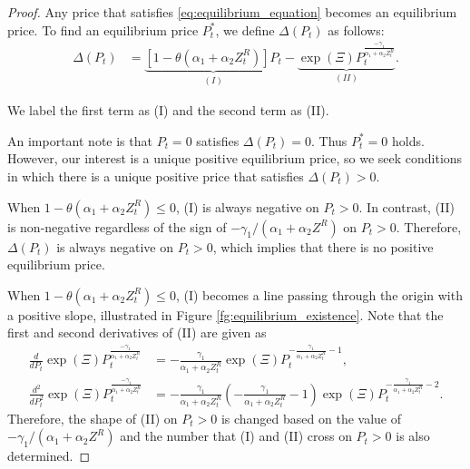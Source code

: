 \documentclass[11pt, a4paper]{article}
\theoremstyle{remark}
\begin{document}
\begin{proof}
Any price that satisfies \eqref{eq:equilibrium_equation} becomes an equilibrium price.
To find an equilibrium price $P_{t}^*$, we define $\Delta(P_t)$ as follows:
\begin{align}
    \Delta(P_t)
    &= \underbrace{[1 - \theta (\alpha_1 + \alpha_2 Z^{R}_{t})]P_t}_{(I)} - \underbrace{\exp(\Xi) P_t^{\frac{-\gamma_1}{\alpha_1 + \alpha_2 Z^{R}_{t}}}}_{(II)} \label{eq:fixed_point}.
\end{align}

We label the first term as (I) and the second term as (II).

An important note is that $P_t =0$ satisfies $\Delta(P_{t}) = 0$.
Thus $P_t^* = 0$ holds.
However, our interest is a unique positive equilibrium price, so we seek conditions in which there is a unique positive price that satisfies $\Delta(P_t)>0$.
    
When $1 - \theta (\alpha_1 + \alpha_2 Z^{R}_{t}) \le 0$, (I) is always negative on $P_t >0$. 
In contrast, (II) is non-negative regardless of the sign of $-\gamma_1/(\alpha_1+\alpha_2 Z^R)$ on $P_t > 0$.
Therefore, $\Delta(P_t)$ is always negative on $P_t>0$, which implies that there is no positive equilibrium price.

When $1 - \theta (\alpha_1 + \alpha_2 Z^{R}_{t}) \le 0$, (I) becomes a line passing through the origin with a positive slope, illustrated in Figure \ref{fg:equilibrium_existence}. 
Note that the first and second derivatives of (II) are given as
\begin{align}
    \frac{d}{dP_t}\exp(\Xi) P_t^{\frac{-\gamma_1}{\alpha_1 + \alpha_2 Z^{R}_{t}}} &= -\frac{\gamma_1}{\alpha_1 + \alpha_2 Z^R_t} \exp(\Xi)P_t^{-\frac{\gamma_1}{\alpha_1 + \alpha_2 Z^R_t} - 1},\\
    \frac{d^2}{dP_t^2} \exp(\Xi) P_t^{\frac{-\gamma_1}{\alpha_1 + \alpha_2 Z^{R}_{t}}} &= -\frac{\gamma_1}{\alpha_1 + \alpha_2 Z^R_t}\left(-\frac{\gamma_1}{\alpha_1 + \alpha_2 Z^R_t} - 1\right) \exp(\Xi) P_t^{-\frac{\gamma_1}{\alpha_1 + \alpha_2 Z^R_t} - 2}.
\end{align}
Therefore, the shape of (II) on $P_t >0$ is changed based on the value of $-\gamma_1/(\alpha_1+\alpha_2 Z^R)$ and the number that (I) and (II) cross on $P_t >0$ is also determined.


\end{proof}
\end{document}
